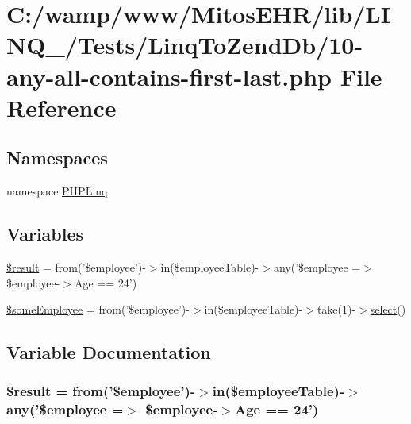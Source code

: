 \hypertarget{_linq_to_zend_db_210-any-all-contains-first-last_8php}{\section{\-C\-:/wamp/www/\-Mitos\-E\-H\-R/lib/\-L\-I\-N\-Q\-\_/\-Tests/\-Linq\-To\-Zend\-Db/10-\/any-\/all-\/contains-\/first-\/last.php \-File \-Reference}
\label{_linq_to_zend_db_210-any-all-contains-first-last_8php}
}
\subsection*{\-Namespaces}
\begin{DoxyCompactItemize}
\item 
namespace \hyperlink{namespace_p_h_p_linq}{\-P\-H\-P\-Linq}
\end{DoxyCompactItemize}
\subsection*{\-Variables}
\begin{DoxyCompactItemize}
\item 
\hyperlink{_linq_to_zend_db_210-any-all-contains-first-last_8php_a112ef069ddc0454086e3d1e6d8d55d07}{\$result} = from('\$employee')-\/$>$in(\$employee\-Table)-\/$>$any('\$employee =$>$ \$employee-\/$>$\-Age == 24')
\item 
\hyperlink{_linq_to_zend_db_210-any-all-contains-first-last_8php_a4b9868169ba54fa01752fb9ad8b015c4}{\$some\-Employee} = from('\$employee')-\/$>$in(\$employee\-Table)-\/$>$take(1)-\/$>$\hyperlink{file__dialog_8php_ae180890d7caabe9962d544350eca4638}{select}()
\end{DoxyCompactItemize}


\subsection{\-Variable \-Documentation}
\hypertarget{_linq_to_zend_db_210-any-all-contains-first-last_8php_a112ef069ddc0454086e3d1e6d8d55d07}{
\subsubsection[{\$result}]{\setlength{\rightskip}{0pt plus 5cm}\$result = from('\$employee')-\/$>$in(\$employee\-Table)-\/$>$any('\$employee =$>$ \$employee-\/$>$\-Age == 24')}}\label{_linq_to_zend_db_210-any-all-contains-first-last_8php_a112ef069ddc0454086e3d1e6d8d55d07}


